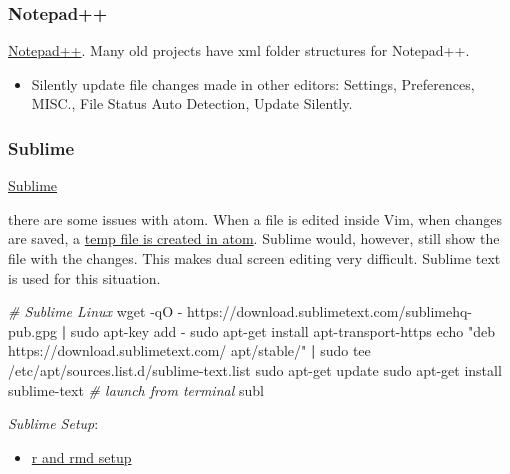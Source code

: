 \documentclass[]{article}
\newenvironment{Shaded}{\begin{snugshade}}{\end{snugshade}}
\newcommand{\BuiltInTok}[1]{#1}
\newcommand{\CommentTok}[1]{\textcolor[rgb]{0.56,0.35,0.01}{\textit{#1}}}
\newcommand{\ExtensionTok}[1]{#1}
\newcommand{\FunctionTok}[1]{\textcolor[rgb]{0.00,0.00,0.00}{#1}}
\newcommand{\KeywordTok}[1]{\textcolor[rgb]{0.13,0.29,0.53}{\textbf{#1}}}
\newcommand{\NormalTok}[1]{#1}
\newcommand{\StringTok}[1]{\textcolor[rgb]{0.31,0.60,0.02}{#1}}
\providecommand{\tightlist}{%
  \setlength{\itemsep}{0pt}\setlength{\parskip}{0pt}}
\begin{document}
\hypertarget{notepad}{%
\subsubsection{Notepad++}\label{notepad}}

\href{https://notepad-plus-plus.org/downloads/v7.8.2/}{Notepad++}. Many
old projects have xml folder structures for Notepad++.

\begin{itemize}
\tightlist
\item
  Silently update file changes made in other editors: Settings,
  Preferences, MISC., File Status Auto Detection, Update Silently.
\end{itemize}

\hypertarget{sublime}{%
\subsubsection{Sublime}\label{sublime}}

\href{https://www.sublimetext.com/3}{Sublime}

there are some issues with atom. When a file is edited inside Vim, when
changes are saved, a
\href{https://github.com/atom/atom/issues/17186}{temp file is created in
atom}. Sublime would, however, still show the file with the changes.
This makes dual screen editing very difficult. Sublime text is used for
this situation.

\begin{Shaded}
\begin{Highlighting}[]
\CommentTok{# Sublime Linux}
\FunctionTok{wget}\NormalTok{ -qO - https://download.sublimetext.com/sublimehq-pub.gpg }\KeywordTok{|} \FunctionTok{sudo}\NormalTok{ apt-key add -}
\FunctionTok{sudo}\NormalTok{ apt-get install apt-transport-https}
\BuiltInTok{echo} \StringTok{"deb https://download.sublimetext.com/ apt/stable/"} \KeywordTok{|} \FunctionTok{sudo}\NormalTok{ tee /etc/apt/sources.list.d/sublime-text.list}
\FunctionTok{sudo}\NormalTok{ apt-get update}
\FunctionTok{sudo}\NormalTok{ apt-get install sublime-text}
\CommentTok{# launch from terminal}
\ExtensionTok{subl}
\end{Highlighting}
\end{Shaded}

\emph{Sublime Setup}:

\begin{itemize}
\tightlist
\item
  \href{https://weibeld.net/r/rmd_sublime_package.html}{r and rmd setup}
\end{itemize}
\end{document}
